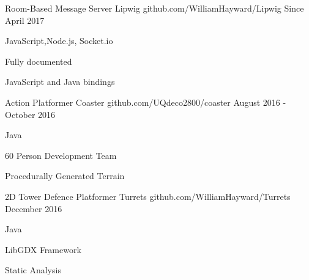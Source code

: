 


\begin{cventries}


\cventry
{Room-Based Message Server} %
{Lipwig} %
{github.com/WilliamHayward/Lipwig} %
{Since April 2017} %
{ %
\begin{cvitems}
\item JavaScript,Node.js, Socket.io
\item Fully documented
\item JavaScript and Java bindings
\end{cvitems}
}


\cventry
{Action Platformer} %
{Coaster} %
{github.com/UQdeco2800/coaster} %
{August 2016 - October 2016} %
{ %
\begin{cvitems}
\item Java
\item 60 Person Development Team
\item Procedurally Generated Terrain
\end{cvitems}
}


\cventry
{2D Tower Defence Platformer} %
{Turrets} %
{github.com/WilliamHayward/Turrets} %
{December 2016} %
{ %
\begin{cvitems}
\item Java
\item LibGDX Framework
\item Static Analysis
\end{cvitems}
}


\end{cventries}